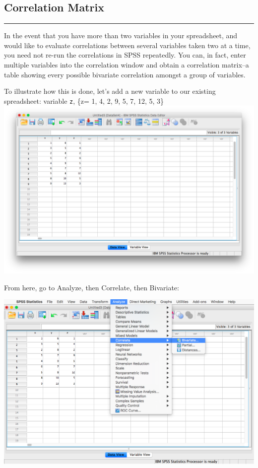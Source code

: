 \documentclass[
]{book}
\begin{document}
\hypertarget{correlation-matrix}{%
\subsection{Correlation Matrix}\label{correlation-matrix}}

\begin{center}\rule{0.5\linewidth}{0.5pt}\end{center}

In the event that you have more than two variables in your spreadsheet, and would like to evaluate correlations between several variables taken two at a time, you need not re-run the correlations in SPSS repeatedly. You can, in fact, enter multiple variables into the correlation window and obtain a correlation matrix--a table showing every possible bivariate correlation amongst a group of variables.

To illustrate how this is done, let's add a new variable to our existing spreadsheet: variable \texttt{z}, \{z= 1, 4, 2, 9, 5, 7, 12, 5, 3\}
\includegraphics{img/3.4.15.png}

From here, go to {Analyze}, then {Correlate}, then {Bivariate}:

\includegraphics{img/3.4.16.png}
\end{document}
